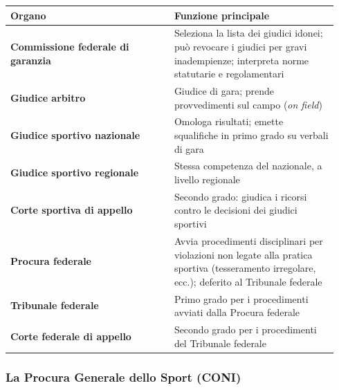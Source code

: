 \documentclass[a4paper,11pt]{article}
\begin{document}
\begin{longtable}[]{@{}p{0.47\linewidth}p{0.47\linewidth}@{}}
      \toprule\noalign{}
      Organo                                    & Funzione principale                       \\
      \midrule\noalign{}
      \endhead
      \bottomrule\noalign{}
      \endlastfoot
      \textbf{Commissione federale di garanzia} & Seleziona la lista dei
      giudici idonei; può revocare i giudici per gravi inadempienze;
      interpreta norme statutarie e regolamentari                                           \\
      \textbf{Giudice arbitro}                  & Giudice di gara; prende provvedimenti sul
      campo (\emph{on field})                                                               \\
      \textbf{Giudice sportivo nazionale}       & Omologa risultati; emette
      squalifiche in primo grado su verbali di gara                                         \\
      \textbf{Giudice sportivo regionale}       & Stessa competenza del nazionale, a
      livello regionale                                                                     \\
      \textbf{Corte sportiva di appello}        & Secondo grado: giudica i ricorsi
      contro le decisioni dei giudici sportivi                                              \\
      \textbf{Procura federale}                 & Avvia procedimenti disciplinari per
      violazioni non legate alla pratica sportiva (tesseramento irregolare,
      ecc.); deferito al Tribunale federale                                                 \\
      \textbf{Tribunale federale}               & Primo grado per i procedimenti avviati
      dalla Procura federale                                                                \\
      \textbf{Corte federale di appello}        & Secondo grado per i procedimenti
      del Tribunale federale                                                                \\
\end{longtable}

\subsubsection{La Procura Generale dello Sport
      (CONI)}\label{la-procura-generale-dello-sport-coni}
\end{document}
